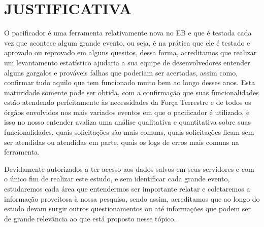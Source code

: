 % 
%


\chapter{JUSTIFICATIVA}
\label{chap:justificativa}
O pacificador é uma ferramenta relativamente nova no EB e que é testada cada vez que acontece algum grande evento, ou seja, é na prática que ele é testado e aprovado ou reprovado em alguns quesitos, dessa forma, acreditamos que realizar um levantamento estatístico ajudaria a sua equipe de desenvolvedores entender alguns gargalos e prováveis falhas que poderiam ser acertadas, assim como, confirmar tudo aquilo que tem funcionado muito bem ao longo desses anos.
Esta maturidade somente pode ser obtida, com a confirmação que suas funcionalidades estão atendendo perfeitamente às necessidades da Força Terrestre e de todos os órgãos envolvidos nos mais variados eventos em que o pacificador é utilizado, e isso no nosso entender avaliza uma análise qualitativa e quantitativa sobre suas funcionalidades, quais solicitações são mais comuns, quais solicitações ficam sem ser atendidas ou atendidas em parte, quais os logs de erros mais comuns na ferramenta.

Devidamente autorizados a ter acesso aos dados salvos em seus servidores e com o único fim de realizar este estudo, e sem identificar cada grande evento, estudaremos cada área que entendermos ser importante relatar e coletaremos a informação proveitosa à nossa pesquisa, sendo assim, acreditamos que ao longo do estudo devam surgir outros questionamentos ou até informações que podem ser de grande relevância ao que está proposto nesse tópico.


